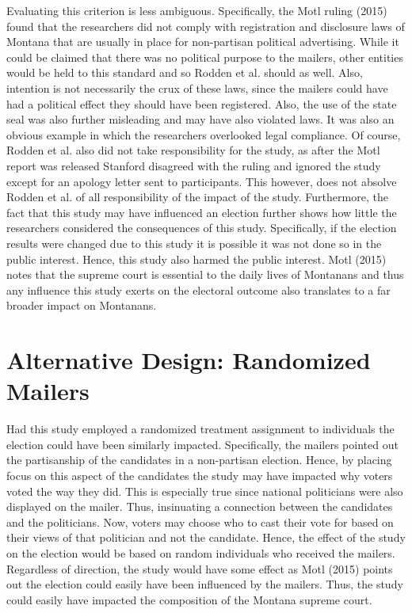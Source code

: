 \documentclass[12pt]{article}
\begin{document}
Evaluating this criterion is less ambiguous. Specifically, the Motl ruling (2015) found that the researchers did not comply with registration and disclosure laws of Montana that are usually in place for non-partisan political advertising. While it could be claimed that there was no political purpose to the mailers, other entities would be held to this standard and so Rodden et al. should as well. Also, intention is not necessarily the crux of these laws, since the mailers could have had a political effect they should have been registered. Also, the use of the state seal was also further misleading and may have also violated laws. It was also an obvious example in which the researchers overlooked legal compliance. Of course, Rodden et al. also did not take responsibility for the study, as after the Motl report was released Stanford disagreed with the ruling and ignored the study except for an apology letter sent to participants. This however, does not absolve Rodden et al. of all responsibility of the impact of the study.  Furthermore, the fact that this study may have influenced an election further shows how little the researchers considered the consequences of this study. Specifically, if the election results were changed due to this study it is possible it was not done so in the public interest. Hence, this study also harmed the public interest. Motl (2015) notes that the supreme court is essential to the daily lives of Montanans and thus any influence this study exerts on the electoral outcome also translates to a far broader impact on Montanans. 

\section{Alternative Design: Randomized Mailers}

Had this study employed a randomized treatment assignment to individuals the election could have been similarly impacted. Specifically, the mailers pointed out the partisanship of the candidates in a non-partisan election. Hence, by placing focus on this aspect of the candidates the study may have impacted why voters voted the way they did. This is especially true since national politicians were also displayed on the mailer. Thus, insinuating a connection between the candidates and the politicians. Now, voters may choose who to cast their vote for based on their views of that politician and not the candidate. Hence, the effect of the study on the election would be based on random individuals who received the mailers. Regardless of direction, the study would have some effect as Motl (2015) points out the election could easily have been influenced by the mailers. Thus, the study could easily have impacted the composition of the Montana supreme court.
\end{document}
